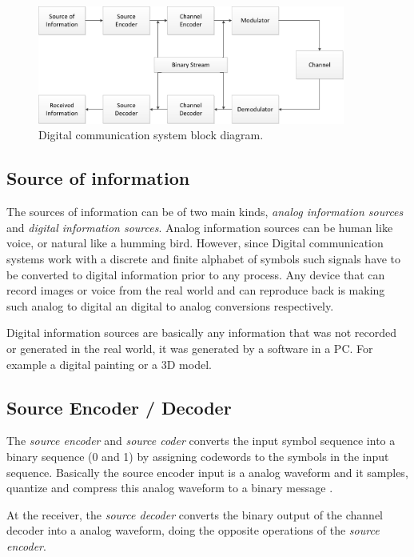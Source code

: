 \begin{figure}[htbp]
    \centering
    \includegraphics[width=0.90\textwidth]{./figures/digicom_bd}
    \caption{ Digital communication system block diagram.
    \label{fig:digcombd}}
\end{figure}

\subsection{Source of information}

The sources of information can be of two main kinds, \emph{analog information
sources} and \emph{digital information sources}. Analog information sources can
be human like voice, or natural like a humming bird. However, since Digital
communication systems work with a discrete and finite alphabet of symbols such
signals have to be converted to digital information prior to any process. Any
device that can record images or voice from the real world and can reproduce
back is making such analog to digital an digital to analog conversions
respectively.

Digital information sources are basically any information that was not
recorded or generated in the real world, it was generated by a software in a
PC. For example a digital painting or a 3D model.

\subsection{Source Encoder / Decoder}

The \emph{source encoder}  and \emph{source coder} converts the input symbol
sequence into a binary sequence (0 and 1) by assigning codewords to the symbols
in the input sequence. Basically the source encoder input is a analog waveform
and it samples, quantize and compress this analog waveform to a binary message
\cite{ocw:digicomm} \cite{akbook}.

At the receiver, the \emph{source decoder} converts the binary output of the
channel decoder into a analog waveform, doing the opposite operations of the
\emph{source encoder}.

